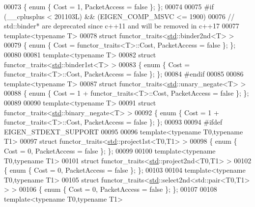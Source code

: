 \begin{DoxyCode}
00073 \{ \textcolor{keyword}{enum} \{ Cost = 1, PacketAccess = \textcolor{keyword}{false} \}; \};
00074 
00075 \textcolor{preprocessor}{#if (\_\_cplusplus < 201103L) && (EIGEN\_COMP\_MSVC <= 1900)}
00076 \textcolor{comment}{// std::binder* are deprecated since c++11 and will be removed in c++17}
00077 \textcolor{keyword}{template}<\textcolor{keyword}{typename} T>
00078 \textcolor{keyword}{struct }functor\_traits<\hyperlink{namespacestd}{std}::binder2nd<T> >
00079 \{ \textcolor{keyword}{enum} \{ Cost = functor\_traits<T>::Cost, PacketAccess = \textcolor{keyword}{false} \}; \};
00080 
00081 \textcolor{keyword}{template}<\textcolor{keyword}{typename} T>
00082 \textcolor{keyword}{struct }functor\_traits<\hyperlink{namespacestd}{std}::binder1st<T> >
00083 \{ \textcolor{keyword}{enum} \{ Cost = functor\_traits<T>::Cost, PacketAccess = \textcolor{keyword}{false} \}; \};
00084 \textcolor{preprocessor}{#endif}
00085 
00086 \textcolor{keyword}{template}<\textcolor{keyword}{typename} T>
00087 \textcolor{keyword}{struct }functor\_traits<\hyperlink{namespacestd}{std}::unary\_negate<T> >
00088 \{ \textcolor{keyword}{enum} \{ Cost = 1 + functor\_traits<T>::Cost, PacketAccess = \textcolor{keyword}{false} \}; \};
00089 
00090 \textcolor{keyword}{template}<\textcolor{keyword}{typename} T>
00091 \textcolor{keyword}{struct }functor\_traits<\hyperlink{namespacestd}{std}::binary\_negate<T> >
00092 \{ \textcolor{keyword}{enum} \{ Cost = 1 + functor\_traits<T>::Cost, PacketAccess = \textcolor{keyword}{false} \}; \};
00093 
00094 \textcolor{preprocessor}{#ifdef EIGEN\_STDEXT\_SUPPORT}
00095 
00096 \textcolor{keyword}{template}<\textcolor{keyword}{typename} T0,\textcolor{keyword}{typename} T1>
00097 \textcolor{keyword}{struct }functor\_traits<\hyperlink{namespacestd}{std}::project1st<T0,T1> >
00098 \{ \textcolor{keyword}{enum} \{ Cost = 0, PacketAccess = \textcolor{keyword}{false} \}; \};
00099 
00100 \textcolor{keyword}{template}<\textcolor{keyword}{typename} T0,\textcolor{keyword}{typename} T1>
00101 \textcolor{keyword}{struct }functor\_traits<\hyperlink{namespacestd}{std}::project2nd<T0,T1> >
00102 \{ \textcolor{keyword}{enum} \{ Cost = 0, PacketAccess = \textcolor{keyword}{false} \}; \};
00103 
00104 \textcolor{keyword}{template}<\textcolor{keyword}{typename} T0,\textcolor{keyword}{typename} T1>
00105 \textcolor{keyword}{struct }functor\_traits<\hyperlink{namespacestd}{std}::select2nd<std::pair<T0,T1> > >
00106 \{ \textcolor{keyword}{enum} \{ Cost = 0, PacketAccess = \textcolor{keyword}{false} \}; \};
00107 
00108 \textcolor{keyword}{template}<\textcolor{keyword}{typename} T0,\textcolor{keyword}{typename} T1>

\end{DoxyCode}
